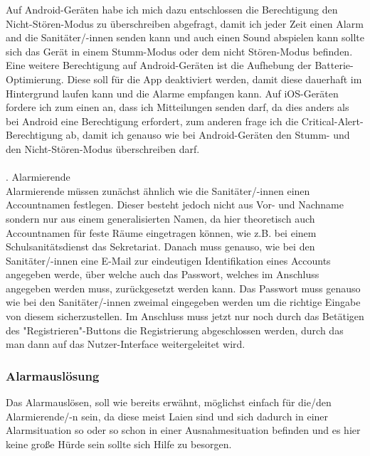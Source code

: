             Auf Android-Geräten habe ich mich dazu entschlossen die Berechtigung den Nicht-Stören-Modus zu überschreiben abgefragt, damit ich jeder Zeit einen Alarm and die Sanitäter/-innen senden kann
            und auch einen Sound abspielen kann sollte sich das Gerät in einem Stumm-Modus oder dem nicht Stören-Modus befinden.
            Eine weitere Berechtigung auf Android-Geräten ist die Aufhebung der Batterie-Optimierung. Diese soll für die App deaktiviert werden, damit diese dauerhaft im Hintergrund laufen kann und die Alarme
            empfangen kann. Auf iOS-Geräten fordere ich zum einen an, dass ich Mitteilungen senden darf, da dies anders als bei Android eine Berechtigung erfordert, zum anderen
            frage ich die Critical-Alert-Berechtigung ab, damit ich genauso wie bei Android-Geräten den Stumm- und den Nicht-Stören-Modus überschreiben darf.
            \\\\. Alarmierende
            \\ Alarmierende müssen zunächst ähnlich wie die Sanitäter/-innen einen Accountnamen festlegen. Dieser besteht jedoch nicht aus
            Vor- und Nachname sondern nur aus einem generalisierten Namen, da hier theoretisch auch Accountnamen für feste Räume eingetragen können,
            wie z.B. bei einem Schulsanitätsdienst das Sekretariat. Danach muss genauso, wie bei den Sanitäter/-innen eine E-Mail zur eindeutigen Identifikation eines
            Accounts angegeben werde, über welche auch das Passwort, welches im Anschluss angegeben werden muss, zurückgesetzt werden kann.
            Das Passwort muss genauso wie bei den Sanitäter/-innen zweimal eingegeben werden um die richtige Eingabe von diesem sicherzustellen.
            Im Anschluss muss jetzt nur noch durch das Betätigen des "Registrieren"-Buttons die Registrierung abgeschlossen werden, durch das man dann auf das Nutzer-Interface weitergeleitet wird.


    \subsubsection{Alarmauslösung}
    Das Alarmauslösen, soll wie bereits erwähnt, möglichst einfach für die/den Alarmierende/-n sein, da diese meist Laien sind und sich dadurch in einer
    Alarmsituation so oder so schon in einer Ausnahmesituation befinden und es hier keine große Hürde sein sollte sich Hilfe zu besorgen.

